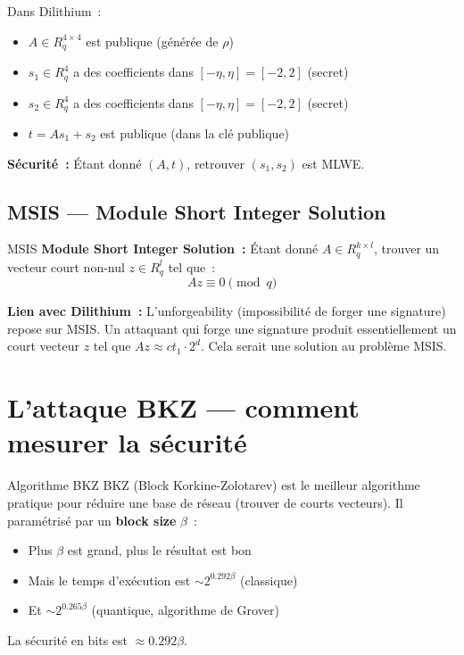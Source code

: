 \documentclass[12pt, a4paper]{article}
\begin{document}
\begin{importantbox}
Dans Dilithium~:
\begin{itemize}
  \item $A \in R_q^{4 \times 4}$ est publique (générée de $\rho$)
  \item $s_1 \in R_q^4$ a des coefficients dans $[-\eta, \eta] = [-2, 2]$ (secret)
  \item $s_2 \in R_q^4$ a des coefficients dans $[-\eta, \eta] = [-2, 2]$ (secret)
  \item $t = As_1 + s_2$ est publique (dans la clé publique)
\end{itemize}
\textbf{Sécurité~:} Étant donné $(A, t)$, retrouver $(s_1, s_2)$ est MLWE.
\end{importantbox}

\subsection{MSIS --- Module Short Integer Solution}

\begin{defbox}{MSIS}
\textbf{Module Short Integer Solution~:}
Étant donné $A \in R_q^{k \times l}$, trouver un vecteur court non-nul
$z \in R_q^l$ tel que~:
$$Az \equiv 0 \pmod{q}$$
\end{defbox}

\begin{importantbox}
\textbf{Lien avec Dilithium~:} L'unforgeability (impossibilité de forger
une signature) repose sur MSIS. Un attaquant qui forge une signature
produit essentiellement un court vecteur $z$ tel que $Az \approx ct_1 \cdot 2^d$.
Cela serait une solution au problème MSIS.
\end{importantbox}

\section{L'attaque BKZ --- comment mesurer la sécurité}

\begin{defbox}{Algorithme BKZ}
BKZ (Block Korkine-Zolotarev) est le meilleur algorithme pratique
pour réduire une base de réseau (trouver de courts vecteurs).
Il paramétrisé par un \textbf{block size} $\beta$~:

\begin{itemize}
  \item Plus $\beta$ est grand, plus le résultat est bon
  \item Mais le temps d'exécution est $\sim 2^{0.292\beta}$ (classique)
  \item Et $\sim 2^{0.265\beta}$ (quantique, algorithme de Grover)
\end{itemize}

La sécurité en bits est $\approx 0.292\beta$.
\end{defbox}
\end{document}
